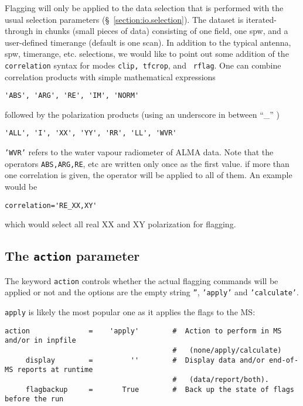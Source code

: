 Flagging will only be applied to the data selection that is performed
with the usual selection parameters (\S~\ref{section:io.selection}).
The dataset is iterated-through in chunks (small pieces of data)
consisting of one field, one spw, and a user-defined timerange
(default is one scan). In addition to the typical antenna, spw,
timerange, etc. selections, we would like to point out some addition
of the {\tt correlation} syntax for modes {\tt clip, tfcrop}, and {\tt
  rflag}. One can combine correlation products with simple
mathematical expressions  

\small
\begin{verbatim}
'ABS', 'ARG', 'RE', 'IM', 'NORM' 
\end{verbatim}
\normalsize
followed by the polarization products (using an underscore in between ``\_'' )

\small
\begin{verbatim}
'ALL', 'I', 'XX', 'YY', 'RR', 'LL', 'WVR' 
\end{verbatim}
\normalsize

{\tt 'WVR'} refers to the water vapour radiometer of ALMA data. Note that
the operators {\tt ABS,ARG,RE}, etc are written only once as the first
value.  if more than one correlation is given, the operator will be
applied to all of them. An example would be 

\small
\begin{verbatim}
correlation='RE_XX,XY'
\end{verbatim}
\normalsize

which would select all real XX and XY polarization for flagging. 

\subsection{The {\tt action} parameter}
\label{section:edit.tflagdata.action}

The keyword {\tt action} controls whether the actual flagging
commands will be applied or not and the options are the empty string
{\tt ''}, {\tt 'apply'} and {\tt 'calculate'}.

{\tt apply} is likely the most popular one as it applies the flags to the MS:
\small
\begin{verbatim}
action              =    'apply'        #  Action to perform in MS and/or in inpfile
                                        #   (none/apply/calculate)
     display        =         ''        #  Display data and/or end-of-MS reports at runtime
                                        #   (data/report/both).
     flagbackup     =       True        #  Back up the state of flags before the run
\end{verbatim}
\normalsize

